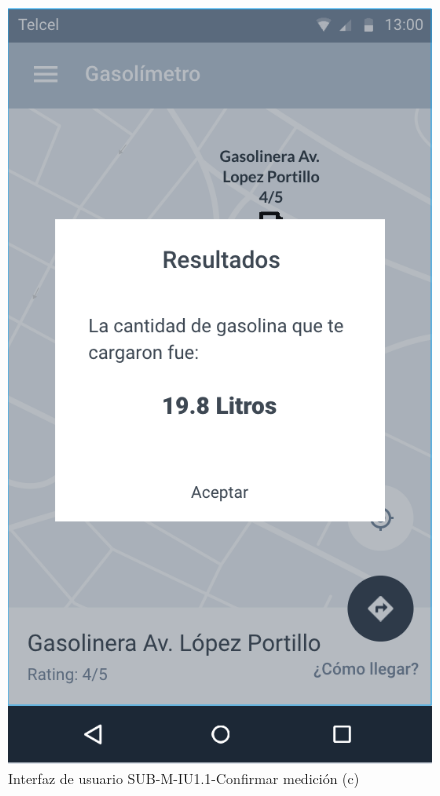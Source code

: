 \begin{figure}[H]
	\centering
	\includegraphics[scale=.55]{Capitulo4/software/submodulos/mediciones/images/sub-m-iu1_1_c}
	\caption{Interfaz de usuario SUB-M-IU1.1-Confirmar medición (c)}
	\label{fig:sub-m-iu1.1.c}
\end{figure}